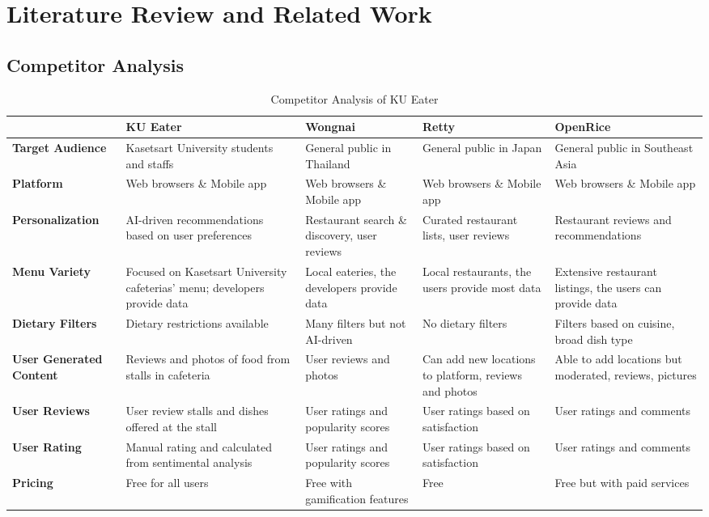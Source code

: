 \chapter{Literature Review and Related Work}
\label{chap:relatedworks}

\section{Competitor Analysis}
\label{section:competitor-analysis}

\begin{table}[h!]
    \begin{adjustwidth}{-.85in}{-.85in}
        \noindent
        \centering
        \small\begin{tabularx}{1.3\textwidth}{|X|>{\columncolor{green!20}}X|X|X|X|}
            \hline & \textbf{KU Eater} & \textbf{Wongnai} & \textbf{Retty} & \textbf{OpenRice} \\\hline
            \textbf{Target Audience} & Kasetsart University students and staffs & General public in Thailand & General public in Japan & General public in Southeast Asia \\\hline
            \textbf{Platform} & Web browsers \& Mobile app & Web browsers \& Mobile app & Web browsers \& Mobile app & Web browsers \& Mobile app \\\hline
            \textbf{Personalization} & AI-driven recommendations based on user preferences & Restaurant search \& discovery, user reviews & Curated restaurant lists, user reviews & Restaurant reviews and recommendations \\\hline
            \textbf{Menu Variety} & Focused on Kasetsart University cafeterias' menu; developers provide data & Local eateries, the developers provide data & Local restaurants, the users provide most data & Extensive restaurant listings, the users can provide data \\\hline
            \textbf{Dietary Filters} & Dietary restrictions available & Many filters but not AI-driven & No dietary filters & Filters based on cuisine, broad dish type \\\hline
            \textbf{User Generated Content} & Reviews and photos of food from stalls in cafeteria & User reviews and photos & Can add new locations to platform, reviews and photos & Able to add locations but moderated, reviews, pictures \\\hline
            \textbf{User Reviews} & User review stalls and dishes offered at the stall & User ratings and popularity scores & User ratings based on satisfaction & User ratings and comments \\\hline
            \textbf{User Rating} & Manual rating and calculated from sentimental analysis & User ratings and popularity scores & User ratings based on satisfaction & User ratings and comments \\\hline
            \textbf{Pricing} & Free for all users & Free with gamification features & Free & Free but with paid services \\\hline
        \end{tabularx}
    \end{adjustwidth}
    \caption{Competitor Analysis of KU Eater}
\end{table}

